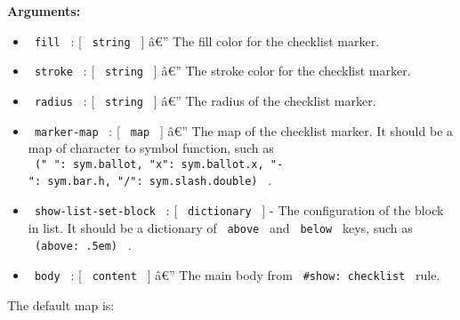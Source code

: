 \textbf{Arguments:}

\begin{itemize}
\tightlist
\item
  \texttt{\ fill\ } : {[} \texttt{\ string\ } {]} â€'' The fill color
  for the checklist marker.
\item
  \texttt{\ stroke\ } : {[} \texttt{\ string\ } {]} â€'' The stroke
  color for the checklist marker.
\item
  \texttt{\ radius\ } : {[} \texttt{\ string\ } {]} â€'' The radius of
  the checklist marker.
\item
  \texttt{\ marker-map\ } : {[} \texttt{\ map\ } {]} â€'' The map of the
  checklist marker. It should be a map of character to symbol function,
  such as
  \texttt{\ ("\ ":\ sym.ballot,\ "x":\ sym.ballot.x,\ "-":\ sym.bar.h,\ "/":\ sym.slash.double)\ }
  .
\item
  \texttt{\ show-list-set-block\ } : {[} \texttt{\ dictionary\ } {]} -
  The configuration of the block in list. It should be a dictionary of
  \texttt{\ above\ } and \texttt{\ below\ } keys, such as
  \texttt{\ (above:\ .5em)\ } .
\item
  \texttt{\ body\ } : {[} \texttt{\ content\ } {]} â€'' The main body
  from \texttt{\ \#show:\ checklist\ } rule.
\end{itemize}

The default map is:

\begin{Shaded}
\begin{Highlighting}[]
\NormalTok{)}
\end{Highlighting}
\end{Shaded}

